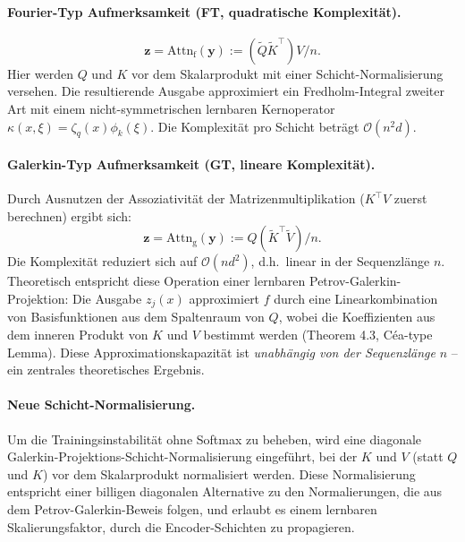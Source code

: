 \documentclass[a4paper,12pt]{article}
\begin{document}
\paragraph{Fourier-Typ Aufmerksamkeit (FT, quadratische Komplexität).}
\begin{equation}
    \mathbf{z} = \mathrm{Attn}_{\mathrm{f}}(\mathbf{y}) := (\widetilde{Q}\widetilde{K}^\top) V / n.
\end{equation}
Hier werden $Q$ und $K$ vor dem Skalarprodukt mit einer Schicht-Normalisierung versehen.
Die resultierende Ausgabe approximiert ein Fredholm-Integral zweiter Art mit einem
nicht-symmetrischen lernbaren Kernoperator $\kappa(x, \xi) = \zeta_q(x)\phi_k(\xi)$.
Die Komplexität pro Schicht beträgt $\mathcal{O}(n^2 d)$.

\paragraph{Galerkin-Typ Aufmerksamkeit (GT, lineare Komplexität).}
Durch Ausnutzen der Assoziativität der Matrizenmultiplikation ($K^\top V$ zuerst berechnen)
ergibt sich:
\begin{equation}
    \mathbf{z} = \mathrm{Attn}_{\mathrm{g}}(\mathbf{y}) := Q(\widetilde{K}^\top \widetilde{V}) / n.
\end{equation}
Die Komplexität reduziert sich auf $\mathcal{O}(nd^2)$, d.h.\ linear in der Sequenzlänge $n$.
Theoretisch entspricht diese Operation einer lernbaren Petrov-Galerkin-Projektion:
Die Ausgabe $z_j(x)$ approximiert $f$ durch eine Linearkombination von Basisfunktionen
aus dem Spaltenraum von $Q$, wobei die Koeffizienten aus dem inneren Produkt von $K$
und $V$ bestimmt werden (Theorem 4.3, Céa-type Lemma). Diese Approximationskapazität
ist \emph{unabhängig von der Sequenzlänge} $n$ -- ein zentrales theoretisches Ergebnis.

\paragraph{Neue Schicht-Normalisierung.}
Um die Trainingsinstabilität ohne Softmax zu beheben, wird eine diagonale
Galerkin-Projektions-Schicht-Normalisierung eingeführt, bei der $K$ und $V$ (statt $Q$ und $K$)
vor dem Skalarprodukt normalisiert werden. Diese Normalisierung entspricht einer
billigen diagonalen Alternative zu den Normalierungen, die aus dem Petrov-Galerkin-Beweis
folgen, und erlaubt es einem lernbaren Skalierungsfaktor, durch die Encoder-Schichten zu
propagieren.

\end{document}
